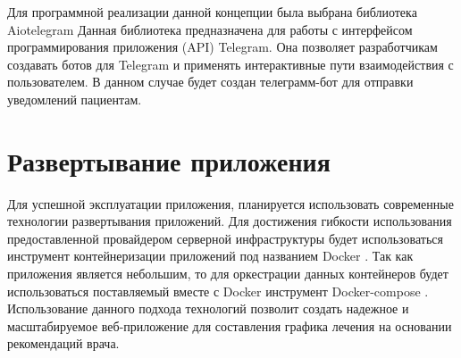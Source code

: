         Для программной реализации данной концепции была выбрана библиотека Aiotelegram \cite{aiotelegram} %
        Данная библиотека предназначена для работы с интерфейсом программирования приложения (API) Telegram. Она позволяет %
        разработчикам создавать ботов для Telegram и применять интерактивные пути взаимодействия с пользователем. В данном %
        случае будет создан телеграмм-бот для отправки уведомлений пациентам.
    
    \section{Развертывание приложения}
        Для успешной эксплуатации приложения, планируется использовать современные технологии %
        развертывания приложений. Для достижения гибкости использования предоставленной провайдером %
        серверной инфраструктуры будет использоваться инструмент контейнеризации приложений под названием %
        Docker \cite{docker}. Так как приложения является небольшим, то для оркестрации данных контейнеров будет использоваться %
        поставляемый вместе с Docker инструмент Docker-compose \cite{docker-compose}.
        Использование данного подхода технологий позволит создать надежное и %
        масштабируемое веб-приложение для составления графика лечения на %
        основании рекомендаций врача. 